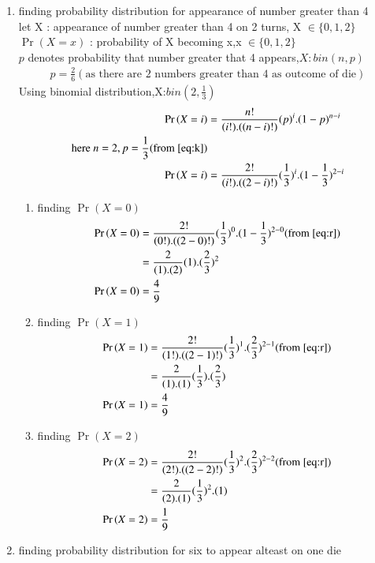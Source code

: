 \documentclass[journal,12pt,onecolumn]{IEEEtran}
\providecommand{\pr}[1]{\ensuremath{\Pr\left(#1\right)}}
\theoremstyle{remark}
\begin{document}
\begin{enumerate}
\item finding probability distribution for appearance of number greater than 4\\
let X : appearance of number greater than 4 on 2 turns,
X $\in \{ 0,1,2 \}$ \\
$\pr{X=x}$ : probability of X becoming x,x $\in \{ 0,1,2 \}$
\\
$p$ denotes probability that number greater that 4 appears,$X:bin(n,p)$ 
\begin{align}
p=\frac{2}{6}(\text{as there are 2 numbers greater than  4 as outcome of die})\label{eq:k} 
\end{align}
Using binomial distribution,X:$bin(2,\frac{1}{3})$
\begin{align}
\pr{X=i}&=\frac{n!}{(i!).((n-i)!)}(p)^i.(1-p)^{n-i}\\
\text{here } n=2,p=\frac{1}{3}  (\text{from } \eqref{eq:k})\\
\pr{X=i}&=\frac{2!}{(i!).((2-i)!)}(\frac{1}{3})^i.(1-\frac{1}{3})^{2-i} \label{eq:r}
\end{align}
\begin{enumerate}
\item finding $\pr{X=0}$
\begin{align}
\pr{X=0}&=\frac{2!}{(0!).((2-0)!)}(\frac{1}{3})^0.(1-\frac{1}{3})^{2-0} (\text{from } \eqref{eq:r})\\
&= \frac{2}{(1).(2)}(1).(\frac{2}{3})^{2}    \\
\pr{X=0}&=\frac{4}{9}
\end{align}
\item finding $\pr{X=1}$
\begin{align}
\pr{X=1}&=\frac{2!}{(1!).((2-1)!)}(\frac{1}{3})^{1}.(\frac{2}{3})^{2-1}(\text{from } \eqref{eq:r})\\
&=\frac{2}{(1).(1)}(\frac{1}{3}).(\frac{2}{3})\\
\pr{X=1}&=\frac{4}{9}
\end{align}
\item finding $\pr{X=2}$
\begin{align}
\pr{X=2}&=\frac{2!}{(2!).((2-2)!)}(\frac{1}{3})^{2}.(\frac{2}{3})^{2-2}(\text{from } \eqref{eq:r})\\
&= \frac{2}{(2).(1)}(\frac{1}{3})^{2}.(1)    \\
\pr{X=2}&=\frac{1}{9}
\end{align}
\end{enumerate}
\item finding probability distribution for six to appear alteast on one die\\

\end{enumerate}
\end{document}
